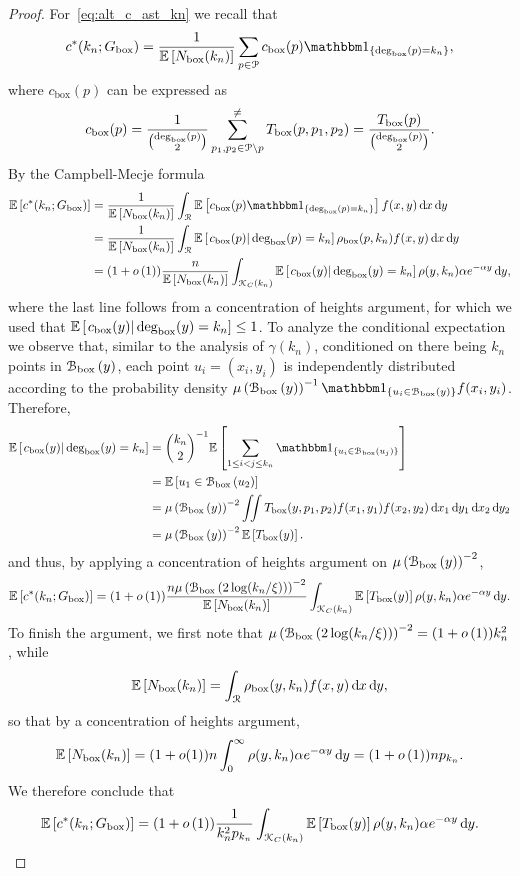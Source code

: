 \begin{proof}
For~\eqref{eq:alt_c_ast_kn} we recall that
\[
	c^\ast(k_n; \Gbox) = \frac{1}{\Exp{\Nbox(k_n)}} \sum_{p \in \Pcal} c_{\text{box}}(p)\ind{\Dbox(p) = k_n},
\]
where $c_{\text{box}}(p)$ can be expressed as
\[
	c_{\text{box}}(p) = \frac{1}{\binom{\text{deg}_{\text{box}}(p)}{2}} \sum_{p_1, p_2 \in {\mathcal P} \setminus p}^{\ne} T_{\text{box}}(p,p_1,p_2)
	= \frac{T_{\text{box}}(p)}{\binom{\text{deg}_{\text{box}}(p)}{2}}.
\]
By the Campbell-Mecje formula
\begin{align*}
	\Exp{c^\ast(k_n; \Gbox)} 
	&= \frac{1}{\Exp{\Nbox(k_n)}} \int_{\Rcal} \Exp{c_{\text{box}}(p)\ind{\Dbox(p) = k_n}} f(x,y) \dd x \dd y\\
	&= \frac{1}{\Exp{\Nbox(k_n)}} \int_{\Rcal} \CExp{c_{\text{box}}(p)}{\Dbox(p) = k_n}\rho_{\text{box}}(p,k_n) 
		f(x,y) \dd x \dd y\\
	&= (1+\smallO{1})\frac{n}{\Exp{\Nbox(k_n)}} \int_{\Kcal_C(k_n)} \CExp{c_{\text{box}}(y)}{\Dbox(y) = k_n}
		\rho(y,k_n) \alpha e^{-\alpha y} \dd y,
\end{align*}
where the last line follows from a concentration of heights argument, for which we used that $\mathbb{E}\left[\left.c_{\text{box}}(y)\right|\text{deg}_{\text{box}}(y) = k_n\right] \le 1$. To analyze the conditional expectation we observe that, similar to the analysis of $\gamma(k_n)$, conditioned on there being $k_n$ points in ${\mathcal B}_{\text{box}}\left(y\right)$, each point $u_i = (x_i,y_i)$ is independently distributed according to the probability density $\Mu{\BallPon{y}}^{-1} \ind{u_i \in \BallPon{y}} f(x_i,y_i)$. Therefore,
\begin{align*}
	\CExp{c_{\text{box}}(y)}{\Dbox(y) = k_n}
	&= \binom{k_n}{2}^{-1} \Exp{\sum_{1 \le i < j \le k_n} \ind{u_i \in \BallPon{u_j}}} \\
	&= \Exp{u_1 \in \BallPon{u_2}} \\
	&= \Mu{\BallPon{y}}^{-2} \iint T_{\text{box}}(y,p_1,p_2) f(x_1,y_1) f(x_2,y_2) 
		\dd x_1 \dd y_1 \dd x_2 \dd y_2\\
	&= \Mu{\BallPon{y}}^{-2} \Exp{T_{\text{box}}(y)}.
\end{align*}
and thus, by applying a concentration of heights argument on $\mu\left({\mathcal B}_{\text{box}}\left(y\right)\right)^{-2}$,
\[
	\mathbb{E}\left[c^\ast(k_n; G_{\mathrm{box}})\right] = (1 + o\left(1\right)) \frac{n \mu\left({\mathcal B}_{\text{box}}\left(2\log(k_n/\xi)\right)\right)^{-2}}{\mathbb{E}\left[N_{\text{box}}(k_n)\right]} \int_{{\mathcal K}_C(k_n)} \mathbb{E}\left[T_{\text{box}}(y)\right] \rho(y,k_n) \alpha e^{-\alpha y} \operatorname{\mathrm{d}\hspace{-2pt}} y.
\]
To finish the argument, we first note that $\mu\left({\mathcal B}_{\text{box}}\left(2\log(k_n/\xi)\right)\right)^{-2} = (1+o\left(1\right))k_n^2$, while
\[
	\mathbb{E}\left[N_{\text{box}}(k_n)\right] = \int_{{\mathcal R}} \rho_{\text{box}}(y,k_n) f(x,y) \operatorname{\mathrm{d}\hspace{-2pt}} x \operatorname{\mathrm{d}\hspace{-2pt}} y,
\]
so that by a concentration of heights argument,
\[
	\mathbb{E}\left[N_{\text{box}}(k_n)\right] = (1+o(1)) n \int_{0}^\infty \rho(y,k_n) \alpha e^{-\alpha y} \operatorname{\mathrm{d}\hspace{-2pt}} y 
	= (1+o\left(1\right)) n p_{k_n}.
\]
We therefore conclude that
\[
	\mathbb{E}\left[c^\ast(k_n; G_{\mathrm{box}})\right] = (1 + o\left(1\right)) \frac{1}{k_n^2 p_{k_n}} \int_{{\mathcal K}_C(k_n)} 
		\mathbb{E}\left[T_{\text{box}}(y)\right] \rho(y,k_n) \alpha e^{-\alpha y} \operatorname{\mathrm{d}\hspace{-2pt}} y.
\]



\end{proof}
